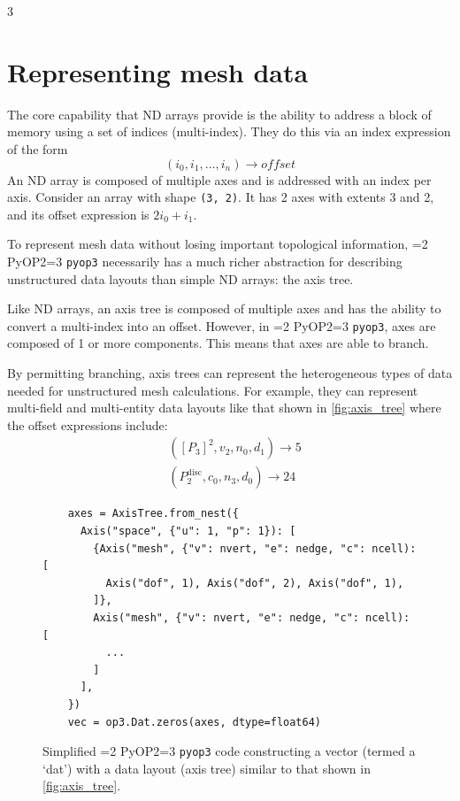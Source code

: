 \documentclass[
]{ImperialPoster}
\def\pyop#1{\ifnum#1=2 {PyOP2}\else \ifnum#1=3 {\texttt{pyop3}}\fi \fi}
\newcommand{\myblue}[1]{\textcolor{ICLBlue}{#1}}
\begin{document}
\begin{multicols}{3}
\vspace{-1em}
\section{Representing mesh data}
\vspace{-.8em}

The core capability that ND arrays provide is the ability to address a block of memory using a set of indices (multi-index).
They do this via an \myblue{index expression} of the form
\begin{equation*}
	(i_0, i_1, \dots, i_n) \to \mathit{offset}
\end{equation*}
An ND array is composed of multiple \myblue{axes} and is addressed with an \myblue{index per axis}.
Consider an array with shape \texttt{(3, 2)}.
It has 2 axes with extents 3 and 2, and its offset expression is $2i_0+i_1$.

\columnbreak


To represent mesh data without losing important topological information, \pyop3 necessarily has a much richer abstraction for describing unstructured data layouts than simple ND arrays: the \myblue{axis tree}.

Like ND arrays, an axis tree is composed of multiple axes and has the ability to convert a multi-index into an offset.
However, in \pyop3, axes are composed of 1 or more \myblue{components}.
This means that axes are able to \myblue{branch}.

By permitting branching, axis trees can represent the heterogeneous types of data needed for unstructured mesh calculations.
For example, they can represent multi-field and multi-entity data layouts like that shown in \cref{fig:axis_tree} where the offset expressions include:
\begin{equation*}
\begin{split}
	&([P_3]^2, v_2, n_0, d_1) \to 5 \\
	&(P_2^\mathrm{disc}, c_0, n_3, d_0) \to 24
\end{split}
\end{equation*}

\begin{figure}[H]
	\centering
	\begin{verbatim}
	axes = AxisTree.from_nest({
	  Axis("space", {"u": 1, "p": 1}): [
	    {Axis("mesh", {"v": nvert, "e": nedge, "c": ncell): [
	      Axis("dof", 1), Axis("dof", 2), Axis("dof", 1),
	    ]},
	    Axis("mesh", {"v": nvert, "e": nedge, "c": ncell): [
	      ...
	    ]
	  ],
	})
	vec = op3.Dat.zeros(axes, dtype=float64)
	\end{verbatim}
	\caption{
		Simplified \pyop3 code constructing a vector (termed a `dat') with a data layout (axis tree) similar to that shown in \cref{fig:axis_tree}.
	}
	\label{listing:axis_tree}
\end{figure}


\end{multicols}
\end{document}
